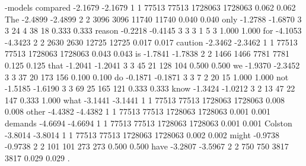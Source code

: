 \documentclass[a4paper,10pt,twoside]{report}
\begin{document}

%
\begin{wout}{\ngram{}-models compared}
 -2.1679  -2.1679 1 1  77513  77513 1728063 1728063 0.062 0.062 The
 -2.4899  -2.4899 2 2   3096   3096   11740   11740 0.040 0.040 only
 -1.2788  -1.6870 3 3     24      4      38      18 0.333 0.333 reason
 -0.2218  -0.4145 3 3      3      1       5       3 1.000 1.000 for
 -4.1053  -4.3423 2 2   2630   2630   12725   12725 0.017 0.017 caution
 -2.3462  -2.3462 1 1  77513  77513 1728063 1728063 0.043 0.043 is
 -1.7841  -1.7838 2 2   1466   1466    7781    7781 0.125 0.125 that
 -1.2041  -1.2041 3 3     45     21     128     104 0.500 0.500 we
 -1.9370  -2.3452 3 3     37     20     173     156 0.100 0.100 do
 -0.1871  -0.1871 3 3      7      2      20      15 1.000 1.000 not
 -1.5185  -1.6190 3 3     69     25     165     121 0.333 0.333 know
 -1.3424  -1.0212 3 2     13     47      22     147 0.333 1.000 what
 -3.1441  -3.1441 1 1  77513  77513 1728063 1728063 0.008 0.008 other
 -4.4382  -4.4382 1 1  77513  77513 1728063 1728063 0.001 0.001 demands
 -4.6694  -4.6694 1 1  77513  77513 1728063 1728063 0.001 0.001 Colston
 -3.8014  -3.8014 1 1  77513  77513 1728063 1728063 0.002 0.002 might
 -0.9738  -0.9738 2 2    101    101     273     273 0.500 0.500 have
 -3.2807  -3.5967 2 2    750    750    3817    3817 0.029 0.029 .
\end{wout}
\end{document}
